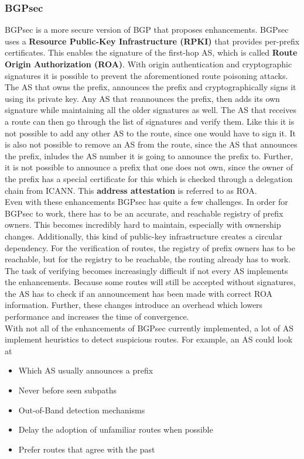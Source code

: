 \subsubsection{BGPsec}
BGPsec is a more secure version of BGP that proposes enhancements. BGPsec uses a \textbf{Resource Public-Key Infrastructure (RPKI)} that provides per-prefix certificates. This enables the signature of the first-hop AS, which is called \textbf{Route Origin Authorization (ROA)}. With origin authentication and cryptographic signatures it is possible to prevent the aforementioned route poisoning attacks.\\
The AS that owns the prefix, announces the prefix and cryptographically signs it using its private key. Any 
AS that reannounces the prefix, then adds its own signature while maintaining all the older signatures as well. The AS that receives a route can then go through the list of signatures and verify them. Like this it is not possible to add any other AS to the route, since one would have to sign it. It is also not possible to remove an AS from the route, since the AS that announces the prefix, inludes the AS number it is going to announce the prefix to. Further, it is not possible to announce a prefix that one does not own, since the owner of the prefix has a special certificate for this which is checked through a delegation chain from ICANN. This \textbf{address attestation} is referred to as ROA. \vspace{.3cm}\\

Even with these enhancements BGPsec has quite a few challenges. In order for BGPsec to work, there has to be an accurate, and reachable registry of prefix owners. This becomes incredibly hard to maintain, especially with ownership changes. Additionally, this kind of public-key infrastructure creates a circular dependency. For the verification of routes, the registry of prefix owners has to be reachable, but for the registry to be reachable, the routing already has to work. The task of verifying becomes increasingly difficult if not every AS implements the enhancements. Because some routes will still be accepted without signatures, the AS has to check if an announcement has been made with correct ROA information. Further, these changes introduce an overhead which lowers performance and increases the time of convergence. \\
With not all of the enhancements of BGPsec currently implemented, a lot of AS implement heuristics to detect suspicious routes. For example, an AS could look at
\begin{itemize}
\item Which AS usually announces a prefix
\item Never before seen subpaths
\item Out-of-Band detection mechanisms
\item Delay the adoption of unfamiliar routes when possible
\item Prefer routes that agree with the past
\end{itemize}

